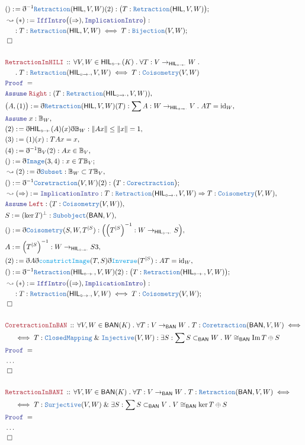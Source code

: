 \documentclass[12pt]{scrartcl}
\newcommand{\TYPE}[1]{\textcolor{NavyBlue}{\mathtt{#1}}}
\newcommand{\FUNC}[1]{\textcolor{Cerulean}{\mathtt{#1}}}
\newcommand{\LOGIC}[1]{\textcolor{Blue}{\mathtt{#1}}}
\newcommand{\THM}[1]{\textcolor{Maroon}{\mathtt{#1}}}
\renewcommand{\.}{\; . \;}
\newcommand{\de}{: \kern 0.1pc =}
\newcommand{\Theorem}[2]{& \THM{#1} \, :: \, #2 \\ & \Proof = \\ }
\newcommand{\NewLine}{\\ & \kern 1pc}
\newcommand{\Page}[1]{\begin{align*} #1 \end{align*} \newpage   }
\newcommand{ \bd }{ \ByDef }
\newcommand{\NoProof}{ & \ldots \\ \EndProof}
\renewcommand{\And}{\; \& \;}
\DeclareMathOperator*{\id}{id}
\DeclareMathOperator*{\im}{Im}
\newcommand{\Say}[3]{& #1 \de #2 : #3, \\}
\newcommand{\Conclude}[3]{& #1 \de #2 : #3; \\}
\newcommand{\Derive}[3]{& \leadsto #1 \de #2 : #3, \\}
\newcommand{\DeriveConclude}[3]{& \leadsto #1 \de #2 : #3 ; \\}
\newcommand{\A}{\LOGIC{Assume} \;}
\newcommand{\Assume}[2]{& \A #1 : #2, \\}
\newcommand{\QED}{\; \square}
\newcommand{\EndProof}{& \QED \\}
\newcommand{\ByDef}{\eth}
\newcommand{\Proof}{\LOGIC{Proof} \; }
\newcommand{\BAN}{\textsf{BAN}}
\newcommand{\HIL}{\textsf{HIL}}
\newcommand{\HILI}{{\textsf{HIL}_{\circ \to \cdot}}}
\begin{document}
\Page{
\Conclude{()}{\bd^{-1} \TYPE{Retraction}(\HIL,V,W)(2)}{\big(T : \TYPE{Retraction}(\HIL,V,W) \big)}
\DeriveConclude{(*)}{\LOGIC{IffIntro}\big((\Rightarrow),\LOGIC{ImplicationIntro}\big)}
{ \NewLine :
  T : \TYPE{Retraction}(\HIL,V,W) \iff T : \TYPE{Bijection}(V,W)
}
\EndProof
\\
\Theorem{RetractionInHILI}{
\forall V,W \in \HILI(K) \. \forall T  
 : V \to_{\HILI} W \. \NewLine \.
 T : \TYPE{Retraction}(\HILI,V,W) \iff T : \TYPE{Coisometry}(V,W)
}
\Assume{ \THM{Right} }{ (T : \TYPE{Retraction}(\HILI,V,W))}
\Say{\big(A,(1) \big)}{\bd \TYPE{Retraction}(\HIL,V,W)(T)}{ \sum A : W \to_\HILI V \. AT  = {\id}_W}
\Assume{x}{\mathbb{B}_W}
\Say{(2)}{\bd \HILI(A)(x) \bd \mathbb{B}_W}{ \| A x \| \le \| x \| = 1}
\Say{(3)}{ (1)(x)}{ TA x = x}
\Say{(4)}{ \bd^{-1} \mathbb{B}_V(2)  }{Ax \in \mathbb{B}_V}
\Conclude{()}{\bd \TYPE{Image}(3,4)}{x \in T \mathbb{B}_V}
\Derive{(2)}{\bd \TYPE{Subset}}{  \mathbb{B}_W \subset  T \mathbb{B}_V} 
\Conclude{()}{\bd^{-1} \TYPE{Coretraction}(V,W)(2)}{\big( T : \TYPE{Corectraction} \big)}
\Derive{(\Rightarrow)}{\LOGIC{ImplicationIntro}}{T : \TYPE{Retraction}(\HILI,V,W) \Rightarrow  T : \TYPE{Coisometry}(V,W)}
\Assume{\THM{Left}}{(T : \TYPE{Coisometry}(V,W))}
\Say{S}{(\ker T)^\bot}{\TYPE{Subobject}(\BAN,V)}
\Say{()}{ \bd \TYPE{Coisometry }(S,W,T^{|S})}{\Big( \Big(T^{| S}\Big)^{-1} : W \to_\HILI S \Big)}
\Say{A}{\Big(T^{| S}\Big)^{-1}}{W \to_\HILI S3}
\Say{(2)}{\bd A\bd\FUNC{constrictImage}(T,S)\bd\FUNC{Inverse}(T^{|S})}{AT = {\id}_W}
\Conclude{()}{\bd^{-1} \TYPE{Retraction}(\HILI,V,W)(2)}{\big(T : \TYPE{Retraction}(\HILI,V,W) \big)}
\DeriveConclude{(*)}{\LOGIC{IffIntro}\big((\Rightarrow),\LOGIC{ImplicationIntro}\big)}
{ \NewLine :
  T : \TYPE{Retraction}(\HILI,V,W) \iff T : \TYPE{Coisometry}(V,W)
}
\EndProof
\\
\Theorem{CoretractionInBAN}{ 
\forall V,W \in \BAN(K) \. \forall T : V \to_{\BAN} W \. 
T : \TYPE{Coretraction}(\BAN,V,W) \iff
 \NewLine \iff
 T : \TYPE{ClosedMapping} \And \TYPE{Injective}(V,W) : 
\exists S  : \sum S \subset_{\BAN}  W \. W \cong_{\BAN} \im T \oplus S 
}
\NoProof
\\
\Theorem{RetractionInBANI}{ 
\forall V,W \in \BAN(K) \. \forall T : V \to_{\BAN} W \. 
T : \TYPE{Retraction}(\BAN,V,W) \iff
 \NewLine \iff
 T : \TYPE{Surjective}(V,W) \And
\exists S  : \sum S \subset_{\BAN}  V \. V \cong_{\BAN} \ker T \oplus S 
}
\NoProof
}
\end{document}
